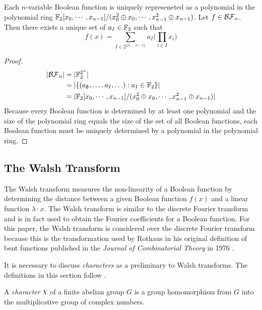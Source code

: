 \begin{theorem}
Each $n$-variable Boolean function is uniquely represeneted as a polynomial
in the polynomial ring $\mathbb{F}_2[x_0,\cdots,x_{n-1}]/ (x_0^2\oplus x_0,\cdots,
x_{n-1}^2 \oplus x_{n-1})$. Let $f\in\mathcal{BF}_n$. Then there exists a unique set
of $a_I\in\mathbb{F}_2$ such that
\begin{equation}\label{eqn:ANF}
  f(x)=\sum_{I\in2^{\{0,\dots,n-1\}}}a_I\bigg(\prod_{i\in I}x_i\bigg)
\end{equation}
\end{theorem}

\begin{proof}
  \begin{align*}
  \lvert\mathcal{BF}_n\rvert
    &= \lvert \mathbb{F}_2^{2^n} \rvert \\
    &= \lvert \{(a_{\emptyset},\ldots,a_I,\ldots):a_I\in\mathbb{F}_2\} \rvert \\
    &= \lvert \mathbb{F}_2[x_0,\cdots,x_{n-1}]/ (x_0^2\oplus x_0,\cdots,
    x_{n-1}^2 \oplus x_{n-1})\rvert
  \end{align*}
  Because every Boolean function is determined by at least one polynomial
  and the size of the polynomial ring equals the size of the set of all
  Boolean functions, each Boolean function must be uniquely determined by a
  polynomial in the polynomial ring.
\end{proof}

\subsection{The Walsh Transform}
\par The Walsh transform measures the non-linearity of a Boolean function by
determining the distance between a given Boolean function $f(x)$ and a linear
function $\lambda\cdot x$. The Walsh transform is similar to the discrete
Fourier transform and is in fact used to obtain the Fourier coefficients for a
Boolean function. For this paper, the Walsh transform is considered over the
discrete Fourier transform because this is the transformation used by Rothaus
in his original definition of bent functions published in the {\it Journal of
Combinatorial Theory} in 1976 \cite{art:r76}. 

\par It is necessary to discuss \textit{characters} as a preliminary to Walsh
transforms. The definitions in this section follow \cite{bk:lsy11}.

\begin{definition}
  A {\em character} $\Chi$ of a finite abelian group $G$ is a group
  homomorphism from $G$ into the multiplicative group of complex numbers.
\end{definition}

